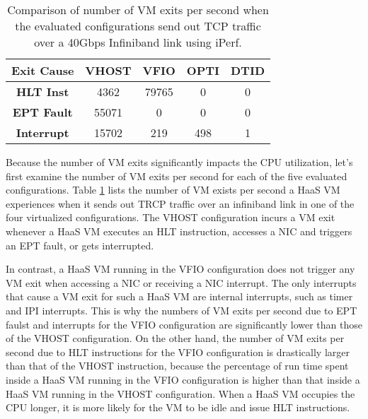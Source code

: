 \begin{table}
\renewcommand{\arraystretch}{1.2}
\small
\begin{center}
\begin{tabular}{|c|c|c|c|c|} \hline
{\bf Exit Cause} & {\bf VHOST } & {\bf VFIO} & {\bf OPTI} & {\bf DTID} \\ \hline
 {\bf HLT Inst}    & 4362  & 79765 & 0    & 0    \\ \hline
 {\bf EPT Fault}  & 55071 & 0     & 0    & 0    \\ \hline
{\bf Interrupt}   & 15702 & 219   & 498  & 1    \\ \hline
\end{tabular}
\end{center}
\vspace{-0.1in}
\caption{Comparison of number of VM exits per second when the evaluated 
configurations send out TCP traffic over a
40Gbps Infiniband link using iPerf.}
\label{tab:vm_exit}
\vspace{-0.1in}
\end{table}

Because the number of VM exits significantly impacts the CPU utilization, 
let's first examine the number of VM exits per second for each of the five 
evaluated configurations. 
Table \ref{tab:vm_exit}  lists the number of VM exists per second a HaaS VM experiences 
when it sends out TRCP traffic over an infiniband link in one of the four virtualized 
configurations. 
The VHOST configuration incurs a VM exit whenever a HaaS VM executes an HLT instruction,
accesses a NIC and triggers an EPT fault, or gets interrupted. 

In contrast, a HaaS VM running in the VFIO configuration does not trigger any VM exit when
accessing a NIC or receiving a NIC interrupt.
The only interrupts that cause a VM exit for such a HaaS VM are internal interrupts, such
as timer and IPI interrupts.
This is why the numbers of VM exits per second due to EPT faulst and interrupts  for the VFIO 
configuration are significantly lower than those of the VHOST configuration.
On the other hand, the number of VM exits per second due to HLT instructions for the VFIO configuration
is drastically larger than that of the VHOST instruction, because 
the percentage of run time spent inside a HaaS VM running in the VFIO configuration 
is higher than that inside a HaaS VM running in the VHOST configuration.
When a HaaS VM occupies the CPU longer, it is more likely for the VM to be idle and issue HLT instructions.


